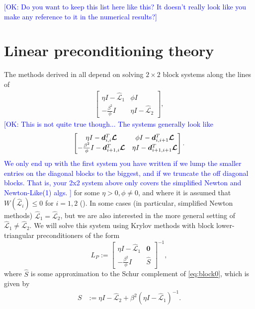 \documentclass[review]{siamart}
\newcommand{\OK}[1]{\textcolor{blue}{[OK: #1]}}
\begin{document}
\OK{Do you want to keep this list here like this? It doesn't really look like you make any reference to it in  the numerical results?}

\section{Linear preconditioning theory}\label{sec:theory}

The methods derived in  all depend on
solving $2\times 2$ block systems along the lines of
%
\begin{align}\label{eq:block0}
\begin{bmatrix} \eta I - \widehat{\mathcal{L}}_1 & \phi I\\
-\frac{\beta^2}{\phi} I & \eta I - \widehat{\mathcal{L}}_2\end{bmatrix},
\end{align}
%
\OK{This is not quite true though... The systems generally look like
\begin{align}
\begin{bmatrix} \eta I - \bm{d}_{i,i}^T \bm{{\cal L}} & \phi I - \bm{d}_{i,i+1}^T \bm{{\cal L}}\\
-\frac{\beta^2}{\phi} I - \bm{d}_{i+1,i}^T \bm{{\cal L}} & \eta I -  \bm{d}_{i+1,i+1}^T \bm{{\cal L}}\end{bmatrix}.
\end{align}
We only end up with the first system you have written if we lump the smaller entries on the diagonal blocks to the biggest, and if we truncate the off diagonal blocks. That is, your 2x2 system above only covers the simplified Newton and Newton-Like(1) algs.
}
%
for some $\eta > 0, \phi \neq 0$, and where it is assumed that
$W(\widehat{\mathcal{L}}_i) \leq 0$ for $i=1,2$ (). In some
cases (in particular, simplified Newton methods) $\widehat{\mathcal{L}}_1 =
\widehat{\mathcal{L}}_2$, but we are also interested in the more general
setting of $\widehat{\mathcal{L}}_1 \neq \widehat{\mathcal{L}}_2$. We will solve
this system using Krylov methods with block lower-triangular preconditioners
of the form
%
\begin{equation}\label{eq:Lprec}
L_P := \begin{bmatrix} \eta I - \widehat{\mathcal{L}}_1 & \mathbf{0} \\ -\frac{\beta^2}{\phi} I
	& \widehat{S}\end{bmatrix}^{-1},
\end{equation}
%
where $\widehat{S}$ is some approximation to the Schur complement of \eqref{eq:block0},
which is given by
%
\begin{align}\label{eq:Schur}
S & := \eta I - \widehat{\mathcal{L}}_2 + \beta^2 (\eta I - \widehat{\mathcal{L}}_1)^{-1}.
\end{align}
%
\end{document}
